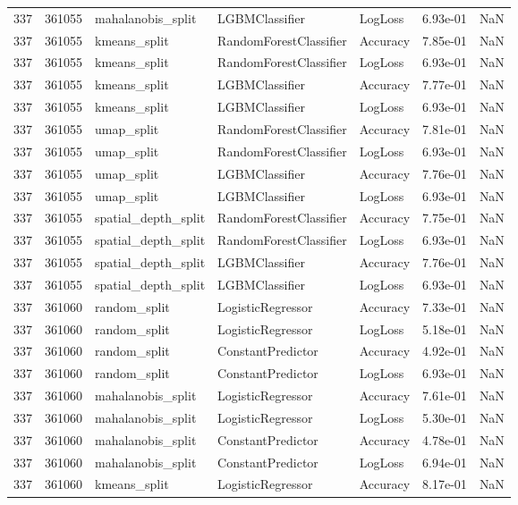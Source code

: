 \begin{tabular}{rrlllrr}
337 & 361055 & mahalanobis\_split & LGBMClassifier & LogLoss & 6.93e-01 & NaN \\
337 & 361055 & kmeans\_split & RandomForestClassifier & Accuracy & 7.85e-01 & NaN \\
337 & 361055 & kmeans\_split & RandomForestClassifier & LogLoss & 6.93e-01 & NaN \\
337 & 361055 & kmeans\_split & LGBMClassifier & Accuracy & 7.77e-01 & NaN \\
337 & 361055 & kmeans\_split & LGBMClassifier & LogLoss & 6.93e-01 & NaN \\
337 & 361055 & umap\_split & RandomForestClassifier & Accuracy & 7.81e-01 & NaN \\
337 & 361055 & umap\_split & RandomForestClassifier & LogLoss & 6.93e-01 & NaN \\
337 & 361055 & umap\_split & LGBMClassifier & Accuracy & 7.76e-01 & NaN \\
337 & 361055 & umap\_split & LGBMClassifier & LogLoss & 6.93e-01 & NaN \\
337 & 361055 & spatial\_depth\_split & RandomForestClassifier & Accuracy & 7.75e-01 & NaN \\
337 & 361055 & spatial\_depth\_split & RandomForestClassifier & LogLoss & 6.93e-01 & NaN \\
337 & 361055 & spatial\_depth\_split & LGBMClassifier & Accuracy & 7.76e-01 & NaN \\
337 & 361055 & spatial\_depth\_split & LGBMClassifier & LogLoss & 6.93e-01 & NaN \\
337 & 361060 & random\_split & LogisticRegressor & Accuracy & 7.33e-01 & NaN \\
337 & 361060 & random\_split & LogisticRegressor & LogLoss & 5.18e-01 & NaN \\
337 & 361060 & random\_split & ConstantPredictor & Accuracy & 4.92e-01 & NaN \\
337 & 361060 & random\_split & ConstantPredictor & LogLoss & 6.93e-01 & NaN \\
337 & 361060 & mahalanobis\_split & LogisticRegressor & Accuracy & 7.61e-01 & NaN \\
337 & 361060 & mahalanobis\_split & LogisticRegressor & LogLoss & 5.30e-01 & NaN \\
337 & 361060 & mahalanobis\_split & ConstantPredictor & Accuracy & 4.78e-01 & NaN \\
337 & 361060 & mahalanobis\_split & ConstantPredictor & LogLoss & 6.94e-01 & NaN \\
337 & 361060 & kmeans\_split & LogisticRegressor & Accuracy & 8.17e-01 & NaN \\

\end{tabular}

